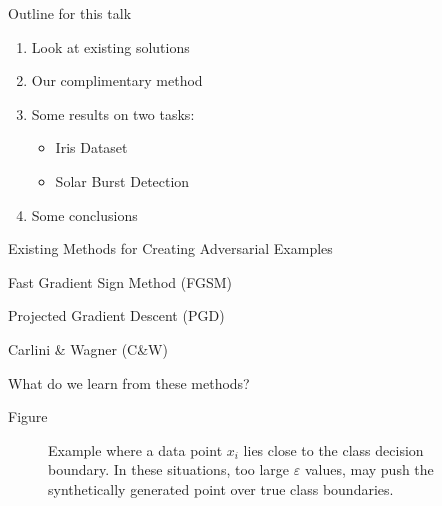 \documentclass[smaller]{beamer}
\begin{document}
\begin{frame}[label={sec:org3c2808e}]{Outline for this talk}
\begin{enumerate}
\item Look at existing solutions
\item Our complimentary method
\item Some results on two tasks:
\begin{itemize}
\item Iris Dataset
\item Solar Burst Detection
\end{itemize}
\item Some conclusions
\end{enumerate}
\end{frame}

\begin{frame}[label={sec:orgaf8ea59}]{Existing Methods for Creating Adversarial Examples}
\end{frame}

\begin{frame}[label={sec:org4c219d3}]{Fast Gradient Sign Method (FGSM)}
\end{frame}

\begin{frame}[label={sec:org12c91ad}]{Projected Gradient Descent (PGD)}
\end{frame}

\begin{frame}[label={sec:org69d2a73}]{Carlini \& Wagner (C\&W)}
\end{frame}

\begin{frame}[label={sec:org18eb631}]{What do we learn from these methods?}
\end{frame}

\begin{frame}[label={sec:orgb6d8ecc}]{Figure}
\begin{figure}
    \centering
    \caption{Example where a data point $x_i$ lies close to the class decision boundary. In these situations, too large $\varepsilon$ values, may push the synthetically generated point over true class boundaries.}
    \label{fig:complexity}
\end{figure}
\end{frame}
\end{document}
